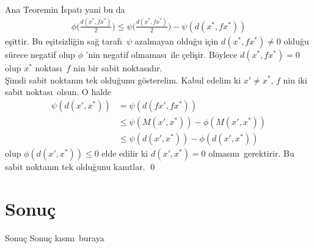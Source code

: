 \documentclass[8pt]{beamer}
\begin{document}
\begin{frame}
  \begin{block}{Ana Teoremin \.{I}spat\i }
    yani bu da
    \begin{align}
      \phi\bigg(\frac{d(x^*,fx^*)}{2}\bigg)  \leq \psi\bigg(\frac{d(x^*,fx^*)}{2}\bigg)-\psi(d(x^*,fx^*))
    \end{align}
e\c{s}ittir. Bu e\c{s}itsizli\u{g}in sa\u{g} taraf\i\ $\psi$ azalmayan oldu\u{g}u i\c{c}in $d(x^*,fx^*)\neq 0$ oldu\u{g}u s\"urece  negatif  olup $\phi$ 'nin negatif olmamas\i\ ile \c{c}eli\c{s}ir. B\"oylece $d(x^*,fx^*)=0$ olup $x^*$ noktas\i\ $f$ nin bir sabit noktas\i d\i r.\\
\vspace{10pt}
\hspace{5pt} \c{S}imdi sabit noktan\i n tek oldu\u{g}unu g\"osterelim. Kabul edelim ki $x'\neq x^*$, $f$ nin iki sabit noktas\i\ olsun. O halde 
   \begin{align}
     \psi(d(x',x^*))&=\psi(d(fx',fx^*))\\
      &\leq \psi(M(x',x^*))-\phi(M(x',x^*))\\
      & \leq \psi(d(x',x^*))-\phi(d(x',x^*))
   \end{align}
olup $\phi(d(x',x^*))\leq 0$ elde edilir ki $d(x',x^*)=0$ olmas\i n\i\ gerektirir. Bu sabit noktan\i n tek oldu\u{g}unu kan\i tlar. \qed
  \end{block}
\end{frame} %

\section{Sonu\c{c}}
\begin{frame}
  \begin{block}{Sonu\c{c}}
     Sonu\c{c} k\i sm\i\ buraya
  \end{block}
\end{frame}
\end{document}
